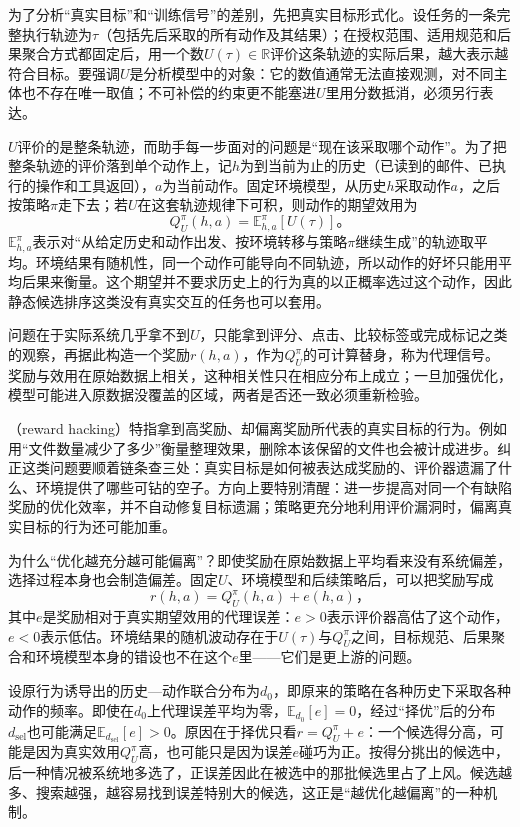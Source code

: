 为了分析“真实目标”和“训练信号”的差别，先把真实目标形式化。设任务的一条完整执行轨迹为$\tau$（包括先后采取的所有动作及其结果）；在授权范围、适用规范和后果聚合方式都固定后，用一个数$U(\tau)\in\mathbb R$评价这条轨迹的实际后果，越大表示越符合目标。要强调$U$是分析模型中的对象：它的数值通常无法直接观测，对不同主体也不存在唯一取值；不可补偿的约束更不能塞进$U$里用分数抵消，必须另行表达。

$U$评价的是整条轨迹，而助手每一步面对的问题是“现在该采取哪个动作”。为了把整条轨迹的评价落到单个动作上，记$h$为到当前为止的历史（已读到的邮件、已执行的操作和工具返回），$a$为当前动作。固定环境模型，从历史$h$采取动作$a$，之后按策略$\pi$走下去；若$U$在这套轨迹规律下可积，则动作的期望效用为
\[
 Q_U^\pi(h,a)=\mathbb E_{h,a}^{\pi}[U(\tau)]\text{。}
\]
$\mathbb E_{h,a}^{\pi}$表示对“从给定历史和动作出发、按环境转移与策略$\pi$继续生成”的轨迹取平均。环境结果有随机性，同一个动作可能导向不同轨迹，所以动作的好坏只能用平均后果来衡量。这个期望并不要求历史上的行为真的以正概率选过这个动作，因此静态候选排序这类没有真实交互的任务也可以套用。

问题在于实际系统几乎拿不到$U$，只能拿到评分、点击、比较标签或完成标记之类的观察，再据此构造一个奖励$r(h,a)$，作为$Q_U^\pi$的可计算替身，称为代理信号。奖励与效用在原始数据上相关，这种相关性只在相应分布上成立；一旦加强优化，模型可能进入原数据没覆盖的区域，两者是否还一致必须重新检验。

（reward hacking）特指拿到高奖励、却偏离奖励所代表的真实目标的行为。例如用“文件数量减少了多少”衡量整理效果，删除本该保留的文件也会被计成进步。纠正这类问题要顺着链条查三处：真实目标是如何被表达成奖励的、评价器遗漏了什么、环境提供了哪些可钻的空子。方向上要特别清醒：进一步提高对同一个有缺陷奖励的优化效率，并不自动修复目标遗漏；策略更充分地利用评价漏洞时，偏离真实目标的行为还可能加重。

为什么“优化越充分越可能偏离”？即使奖励在原始数据上平均看来没有系统偏差，选择过程本身也会制造偏差。固定$U$、环境模型和后续策略后，可以把奖励写成
\[
 r(h,a)=Q_U^\pi(h,a)+e(h,a)\text{，}
\]
其中$e$是奖励相对于真实期望效用的代理误差：$e>0$表示评价器高估了这个动作，$e<0$表示低估。环境结果的随机波动存在于$U(\tau)$与$Q_U^\pi$之间，目标规范、后果聚合和环境模型本身的错设也不在这个$e$里——它们是更上游的问题。

设原行为诱导出的历史—动作联合分布为$d_0$，即原来的策略在各种历史下采取各种动作的频率。即使在$d_0$上代理误差平均为零，$\mathbb E_{d_0}[e]=0$，经过“择优”后的分布$d_{\mathrm{sel}}$也可能满足$\mathbb E_{d_{\mathrm{sel}}}[e]>0$。原因在于择优只看$r=Q_U^\pi+e$：一个候选得分高，可能是因为真实效用$Q_U^\pi$高，也可能只是因为误差$e$碰巧为正。按得分挑出的候选中，后一种情况被系统地多选了，正误差因此在被选中的那批候选里占了上风。候选越多、搜索越强，越容易找到误差特别大的候选，这正是“越优化越偏离”的一种机制。

